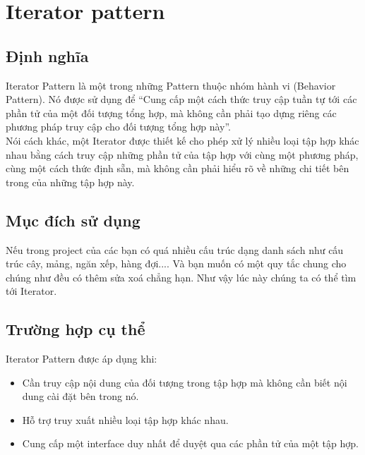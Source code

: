 \chapter{Iterator pattern}

\section{Định nghĩa}
Iterator Pattern là một trong những Pattern thuộc nhóm hành vi (Behavior Pattern). Nó được sử dụng để “Cung cấp một cách thức truy cập tuần tự tới các phần tử của một đối tượng tổng hợp, mà không cần phải tạo dựng riêng các phương pháp truy cập cho đối tượng tổng hợp này”.\\

Nói cách khác, một Iterator được thiết kế cho phép xử lý nhiều loại tập hợp khác nhau bằng cách truy cập những phần tử của tập hợp với cùng một phương pháp, cùng một cách thức định sẵn, mà không cần phải hiểu rõ về những chi tiết bên trong của những tập hợp này.

\section{Mục đích sử dụng}
Nếu trong project của các bạn có quá nhiều cấu trúc dạng danh sách như cấu trúc cây, mảng, ngăn xếp, hàng đợi.... Và bạn muốn có một quy tắc chung cho chúng như đều có thêm sửa xoá chẳng hạn. Như vậy lúc này chúng ta có thể tìm tới Iterator.
\section{Trường hợp cụ thể}
Iterator Pattern được áp dụng khi:

\begin{itemize}
	\item Cần truy cập nội dung của đối tượng trong tập hợp mà không cần biết nội dung cài đặt bên trong nó.\\
	\item Hỗ trợ truy xuất nhiều loại tập hợp khác nhau.\\
	\item Cung cấp một interface duy nhất để duyệt qua các phần tử của một tập hợp.\\
\end{itemize}
